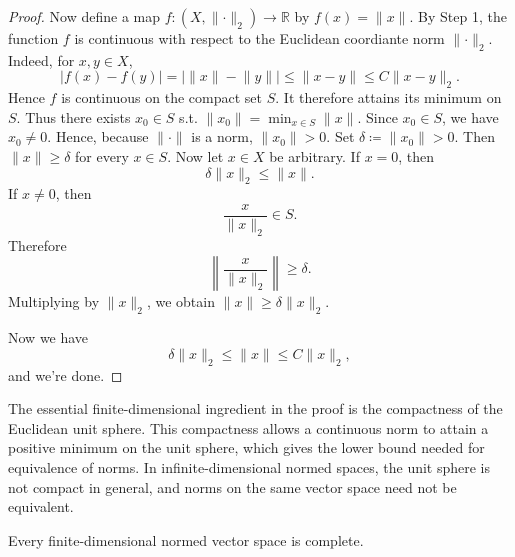 \begin{proof}
    Now define a map \(f: (X, \lVert \cdot \rVert_2 ) \to \mathbb{R}\) by \(f(x) = \lVert x \rVert \). By Step 1, the function \(f\) is continuous with respect to the Euclidean coordiante norm \(\lVert \cdot \rVert_2 \). Indeed, for \(x, y \in X\), 
    \[
        \vert f(x) - f(y) \vert = \left\vert \lVert x \rVert - \lVert y \rVert   \right\vert \le \lVert x - y \rVert  \le C \lVert x - y \rVert_2. 
    \]        
    Hence \(f\) is continuous on the compact set \(S\). It therefore attains its minimum on \(S\). Thus there exists \(x_0 \in S\) s.t. \(\lVert x_0 \rVert = \min _{x \in S} \lVert x \rVert \). Since \(x_0 \in S\), we have \(x_0 \neq 0\). Hence, because \(\lVert \cdot \rVert \) is a norm, \(\lVert x_0 \rVert > 0 \). Set \(\delta \coloneqq \lVert x_0 \rVert > 0\). Then \(\lVert x \rVert \ge \delta \) for every \(x \in S\). Now let \(x \in X\) be arbitrary. If \(x = 0\), then 
    \[
        \delta \lVert x \rVert_2 \le \lVert x \rVert.  
    \]               
    If \(x \neq 0\), then 
    \[
        \frac{x}{\lVert x \rVert_2} \in S.
    \] 
    Therefore 
    \[
        \left\lVert \frac{x}{\lVert x \rVert_2} \right\rVert \ge \delta. 
    \]
    Multiplying by \(\lVert x \rVert_2\), we obtain \(\lVert x \rVert \ge \delta \lVert x \rVert_2  \). 

    Now we have 
    \[
        \delta \lVert x \rVert_2 \le \lVert x \rVert \le C \lVert x \rVert_2,   
    \]  
    and we're done.
\end{proof}

\begin{remark}
    The essential finite-dimensional ingredient in the proof is the compactness of the Euclidean unit sphere. This compactness allows a continuous norm to attain a positive minimum on the unit sphere, which gives the lower bound needed for equivalence of norms. In infinite-dimensional normed spaces, the unit sphere is not compact in general, and norms on the same vector space need not be equivalent.
\end{remark}

\begin{corollary}
    Every finite-dimensional normed vector space is complete.
\end{corollary}

